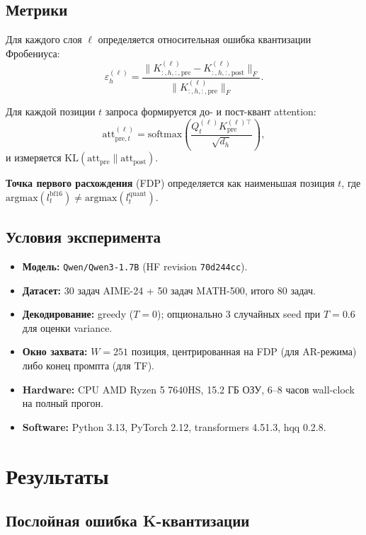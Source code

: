 \documentclass[a4paper,12pt]{article}
\begin{document}
\subsection{Метрики}

Для каждого слоя $\ell$ определяется относительная ошибка квантизации Фробениуса:
\[
\varepsilon^{(\ell)}_h = \frac{\|K^{(\ell)}_{:,h,:,\text{pre}} - K^{(\ell)}_{:,h,:,\text{post}}\|_F}{\|K^{(\ell)}_{:,h,:,\text{pre}}\|_F}.
\]

Для каждой позиции $t$ запроса формируется до- и пост-квант attention:
\[
\text{att}^{(\ell)}_{\text{pre}, t} = \mathrm{softmax}\!\left(\frac{Q^{(\ell)}_t K^{(\ell)\top}_{\text{pre}}}{\sqrt{d_h}}\right),
\]
и измеряется $\mathrm{KL}(\text{att}_\text{pre} \| \text{att}_\text{post})$.

\textbf{Точка первого расхождения} (FDP) определяется как наименьшая позиция $t$, где $\text{argmax}(l_t^\text{bf16}) \ne \text{argmax}(l_t^\text{quant})$.

\subsection{Условия эксперимента}

\begin{itemize}[leftmargin=*]
\item \textbf{Модель:} \texttt{Qwen/Qwen3-1.7B} (HF revision \texttt{70d244cc}).
\item \textbf{Датасет:} 30 задач AIME-24 + 50 задач MATH-500, итого 80 задач.
\item \textbf{Декодирование:} greedy ($T=0$); опционально 3 случайных seed при $T=0.6$ для оценки variance.
\item \textbf{Окно захвата:} $W=251$ позиция, центрированная на FDP (для AR-режима) либо конец промпта (для TF).
\item \textbf{Hardware:} CPU AMD Ryzen 5 7640HS, 15.2 ГБ ОЗУ, 6--8 часов wall-clock на полный прогон.
\item \textbf{Software:} Python 3.13, PyTorch 2.12, transformers 4.51.3, hqq 0.2.8.
\end{itemize}

\section{Результаты}

\subsection{Послойная ошибка K-квантизации}
\end{document}
